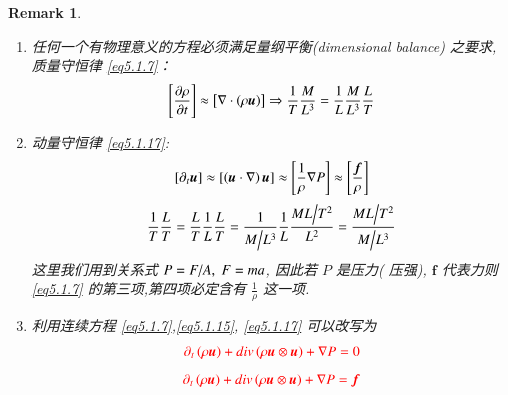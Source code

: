 \documentclass[11pt]{article}
\newtheorem{remark}{Remark}[subsection]
\begin{document}
\begin{remark}
	\text{}
	\vspace{-0.5cm}
	\begin{enumerate}
		\item 任何一个有物理意义的方程必须满足量纲平衡(dimensional balance) 之要求, 质量守恒律 \ref{eq5.1.7}：
		\begin{equation}
		\left[ {\frac{{\partial \rho }}{{\partial t}}} \right] \approx \left[ {\nabla  \cdot \left( {\rho {\boldsymbol{u}}} \right)} \right] \Rightarrow \frac{1}{T}\frac{M}{{{L^3}}} = \frac{1}{L}\frac{M}{{{L^3}}}\frac{L}{T}
		\notag 
		\end{equation}
		\item 动量守恒律 \ref{eq5.1.17}:
		\begin{equation}
		\left[ {{\partial _t}\boldsymbol{u}} \right] \approx \left[ {\left( {\boldsymbol{u} \cdot \nabla } \right)\boldsymbol{u}} \right] \approx \left[ {\frac{1}{\rho }\nabla P} \right] \approx \left[ {\frac{\boldsymbol{f}}{\rho }} \right]
		\notag 
		\end{equation}
		\begin{equation}
		\frac{1}{T}\frac{L}{T} = \frac{L}{T}\frac{1}{L}\frac{L}{T} = \frac{1}{{{M \mathord{\left/
						{\vphantom {M {{L^3}}}} \right.
						\kern-\nulldelimiterspace} {{L^3}}}}}\frac{1}{L}\frac{{{{ML} \mathord{\left/
						{\vphantom {{ML} {{T^2}}}} \right.
						\kern-\nulldelimiterspace} {{T^2}}}}}{{{L^2}}} = \frac{{{{ML} \mathord{\left/
						{\vphantom {{ML} {{T^2}}}} \right.
						\kern-\nulldelimiterspace} {{T^2}}}}}{{{M \mathord{\left/
						{\vphantom {M {{L^3}}}} \right.
						\kern-\nulldelimiterspace} {{L^3}}}}}
		\notag 
		\end{equation}
		这里我们用到关系式 $P = {F \mathord{\left/
				{\vphantom {F A}} \right.
				\kern-\nulldelimiterspace} A},\;F = ma$, 因此若 $ P $ 是压力({\color{red} 压强}),  $ \boldsymbol{f} $ 代表力则 \ref{eq5.1.7} 的第三项,第四项必定含有 $\frac{1}{\rho }$ 这一项.
	    \item 利用连续方程 \ref{eq5.1.7},\ref{eq5.1.15}, \ref{eq5.1.17} 可以改写为
	    \begin{equation}
	    \color{red}
	    {\partial _t}\left( {\rho \boldsymbol{u}} \right) + div\left( {\rho \boldsymbol{u} \otimes \boldsymbol{u}} \right) + \nabla P = 0
	    \notag 
	    \end{equation}
	    \vspace{-1cm}
	    \begin{equation}
	    \color{red}
	    {\partial _t}\left( {\rho \boldsymbol{u}} \right) + div\left( {\rho \boldsymbol{u} \otimes \boldsymbol{u}} \right) + \nabla P = \boldsymbol{f}
	    \notag 
	    \end{equation}
	\end{enumerate}
\end{remark}
\end{document}

